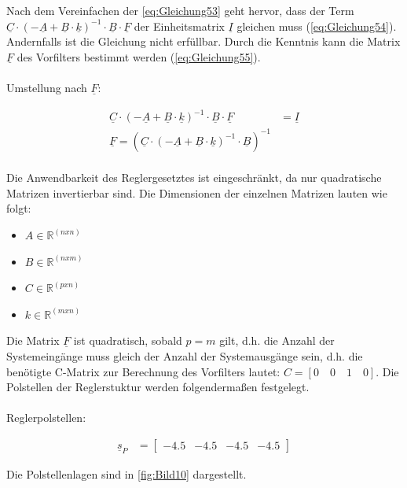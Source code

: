 Nach dem Vereinfachen der \autoref{eq:Gleichung53} geht hervor, dass der Term $\underline{C}\cdot(-\underline{A}+\underline{B}\cdot{\underline{k}})^{-1}\cdot\underline{B}\cdot\underline{F}$ der Einheitsmatrix $\underline{I}$ gleichen muss (\autoref{eq:Gleichung54}). Andernfalls ist die Gleichung nicht erfüllbar. Durch die Kenntnis kann die Matrix $\underline{F}$ des Vorfilters bestimmt werden (\autoref{eq:Gleichung55}).\\\\
Umstellung nach $\underline{F}$:

\begin{align}
    \underline{C}\cdot(-\underline{A}+\underline{B}\cdot{\underline{k}})^{-1}\cdot\underline{B}\cdot\underline{F} &= \underline{I} \label{eq:Gleichung54}\\
    \underline{F} = (\underline{C}\cdot(-\underline{A}+\underline{B}\cdot{\underline{k}})^{-1}\cdot\underline{B})^{-1} \label{eq:Gleichung55}
\end{align}\\

Die Anwendbarkeit des Reglergesetztes ist eingeschränkt, da nur quadratische Matrizen invertierbar sind. Die Dimensionen der einzelnen Matrizen lauten wie folgt:

\begin{itemize}
    \item $A\in\mathbb{R}^{(nxn)}$
    \item $B\in\mathbb{R}^{(nxm)}$
    \item $C\in\mathbb{R}^{(pxn)}$
    \item $k\in\mathbb{R}^{(mxn)}$
\end{itemize}

Die Matrix $\underline{F}$ ist quadratisch, sobald $p = m$ gilt, d.h. die Anzahl der Systemeingänge muss gleich der Anzahl der Systemausgänge sein, d.h. die benötigte C-Matrix zur Berechnung des Vorfilters lautet: $C = [0\quad 0\quad 1\quad 0]$.
Die Polstellen der Reglerstuktur werden folgendermaßen festgelegt.\\\\
Reglerpolstellen:

\begin{align}\label{eq:Gleichung56}
    \underline{s}_{P} &=
    \begin{bmatrix}
        -4.5 & -4.5 & -4.5 & -4.5
    \end{bmatrix}
\end{align}

Die Polstellenlagen sind in \autoref{fig:Bild10} dargestellt.

